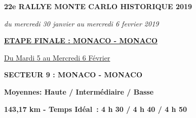 \documentclass{article}%
\begin{document}
%
\normalsize%
\begin{center} \textbf{\LARGE{22e RALLYE MONTE CARLO HISTORIQUE 2019}} \end{center}%
\begin{center} \textit{du mercredi 30 janvier au mercredi 6 fevrier 2019} \end{center}%
\begin{center} \textbf{\underline{ETAPE FINALE : MONACO - MONACO}} \end{center}%
\begin{flushright} \underline{Du Mardi 5 au Mercredi 6 Février} \end{flushright}%
\begin{flushleft} \textbf{SECTEUR 9 : MONACO - MONACO} \end{flushleft}%
\begin{flushright} \textbf{                        Moyennes: Haute / Intermédiaire / Basse
} \end{flushright}%
\begin{flushright} \textbf{143,17 km - Temps Idéal : 4 h 30 / 4 h 40 / 4 h 50
} \end{flushright}%
\end{document}
